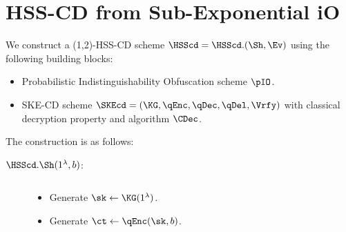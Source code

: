 \section{HSS-CD from Sub-Exponential iO}\label{sec:hss-cd}

We construct a (1,2)-HSS-CD scheme $\HSScd = \HSScd.(\Sh,\Ev)$ using
the following building blocks:

\begin{itemize}
\item Probabilistic Indistinguishability Obfuscation scheme $\pIO$.
\item SKE-CD scheme $\SKEcd=(\KG, \qEnc, \qDec, \qDel, \Vrfy)$ with
classical decryption property and algorithm $\CDec$.
\end{itemize}

The construction is as follows:

\begin{description}
\item [$\HSScd.\Sh(1^\lambda, b)$:] $ $
\begin{itemize}
\item Generate $\sk \gets \KG(1^\lambda)$.
\item Generate $\ct \gets \qEnc(\sk, b)$.

\end{itemize}

\end{description}
